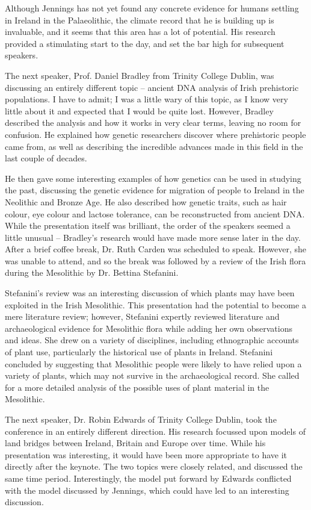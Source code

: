 \documentclass[%
	]{ijsra}
\begin{document}
Although Jennings has not yet found any concrete evidence for humans settling in Ireland in the Palaeolithic, the climate record that he is building up is invaluable, and it seems that this area has a lot of potential. His research provided a stimulating start to the day, and set the bar high for subsequent speakers. 

The next speaker, Prof. Daniel Bradley from Trinity College Dublin, was discussing an entirely different topic – ancient DNA analysis of Irish prehistoric populations. I have to admit; I was a little wary of this topic, as I know very little about it and expected that I would be quite lost. However, Bradley described the analysis and how it works in very clear terms, leaving no room for confusion. He explained how genetic researchers discover where prehistoric people came from, as well as describing the incredible advances made in this field in the last couple of decades. 

He then gave some interesting examples of how genetics can be used in studying the past, discussing the genetic evidence for migration of people to Ireland in the Neolithic and Bronze Age. He also described how genetic traits, such as hair colour, eye colour and lactose tolerance, can be reconstructed from ancient DNA. While the presentation itself was brilliant, the order of the speakers seemed a little unusual – Bradley’s research would have made more sense later in the day. 
After a brief coffee break, Dr. Ruth Carden was scheduled to speak. However, she was unable to attend, and so the break was followed by a review of the Irish flora during the Mesolithic by Dr. Bettina Stefanini. 

Stefanini’s review was an interesting discussion of which plants may have been exploited in the Irish Mesolithic. This presentation had the potential to become a mere literature review; however, Stefanini expertly reviewed literature and archaeological evidence for Mesolithic flora while adding her own observations and ideas. She drew on a variety of disciplines, including ethnographic accounts of plant use, particularly the historical use of plants in Ireland. Stefanini concluded by suggesting that Mesolithic people were likely to have relied upon a variety of plants, which may not survive in the archaeological record. She called for a more detailed analysis of the possible uses of plant material in the Mesolithic. 

The next speaker, Dr. Robin Edwards of Trinity College Dublin, took the conference in an entirely different direction. His research focussed upon models of land bridges between Ireland, Britain and Europe over time. While his presentation was interesting, it would have been more appropriate to have it directly after the keynote. The two topics were closely related, and discussed the same time period. Interestingly, the model put forward by Edwards conflicted with the model discussed by Jennings, which could have led to an interesting discussion. 
\end{document}
